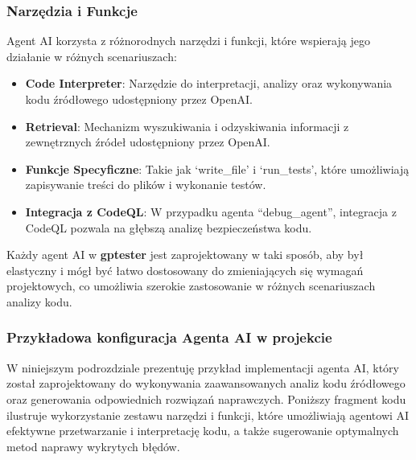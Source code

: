 \subsubsection{Narzędzia i Funkcje}

Agent AI korzysta z różnorodnych narzędzi i funkcji, które wspierają jego działanie w różnych scenariuszach:

\begin{itemize}
    \item \textbf{Code Interpreter}: Narzędzie do interpretacji, analizy oraz wykonywania kodu źródłowego udostępniony przez OpenAI.
    \item \textbf{Retrieval}: Mechanizm wyszukiwania i odzyskiwania informacji z zewnętrznych źródeł udostępniony przez OpenAI.
    \item \textbf{Funkcje Specyficzne}: Takie jak `write\_file' i `run\_tests', które umożliwiają zapisywanie treści do plików i wykonanie testów.
    \item \textbf{Integracja z CodeQL}: W przypadku agenta ``debug\_agent'', integracja z CodeQL pozwala na głębszą analizę bezpieczeństwa kodu.
\end{itemize}


Każdy agent AI w \textbf{gptester} jest zaprojektowany w taki sposób, aby był elastyczny i mógł być łatwo dostosowany do zmieniających się wymagań projektowych, co umożliwia szerokie zastosowanie w różnych scenariuszach analizy kodu.

\subsubsection{Przykładowa konfiguracja Agenta AI w projekcie}
W niniejszym podrozdziale prezentuję przykład implementacji agenta AI, który został zaprojektowany do wykonywania zaawansowanych analiz kodu źródłowego oraz generowania odpowiednich rozwiązań naprawczych. Poniższy fragment kodu ilustruje wykorzystanie zestawu narzędzi i funkcji, które umożliwiają agentowi AI efektywne przetwarzanie i interpretację kodu, a także sugerowanie optymalnych metod naprawy wykrytych błędów. \\
\vfill


